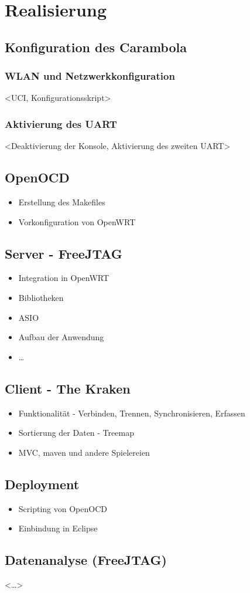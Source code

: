 \chapter{Realisierung}
\section{Konfiguration des Carambola}
\subsection{WLAN und Netzwerkkonfiguration}
<UCI, Konfigurationsskript>
\subsection{Aktivierung des UART}
<Deaktivierung der Konsole, Aktivierung des zweiten UART>
\section{OpenOCD}
\begin{itemize}
  \item Erstellung des Makefiles 
  \item Vorkonfiguration von OpenWRT
\end{itemize}
\section{Server - FreeJTAG}
\begin{itemize}
  \item Integration in OpenWRT
  \item Bibliotheken
  \item ASIO
  \item Aufbau der Anwendung
  \item \ldots
\end{itemize}
\section{Client - The Kraken}
\begin{itemize}
  \item Funktionalität - Verbinden, Trennen, Synchronisieren, Erfassen
  \item Sortierung der Daten - Treemap
  \item MVC, maven und andere Spielereien
\end{itemize}
\section{Deployment}
\begin{itemize}
  \item Scripting von OpenOCD
  \item Einbindung in Eclipse
\end{itemize}
\section{Datenanalyse (FreeJTAG)}
<\ldots>